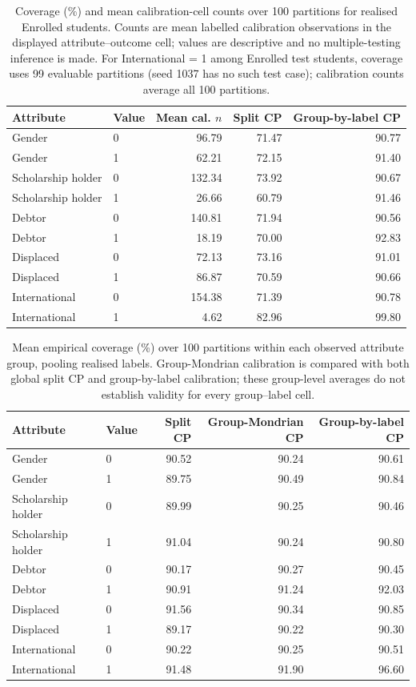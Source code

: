 \begin{table}[htbp]
\centering\small
\caption{Coverage (\%) and mean calibration-cell counts over 100 partitions
for realised \textsf{Enrolled} students. Counts are mean labelled
calibration observations in the displayed attribute--outcome cell;
values are descriptive and no multiple-testing inference is made. For International = 1 among Enrolled test students, coverage uses 99 evaluable partitions (seed 1037 has no such test case); calibration counts average all 100 partitions.}
\label{tab:groupaudit}
\begin{tabular}{llrrr}
\toprule Attribute & Value & Mean cal. $n$ & Split CP & Group-by-label CP\\
\midrule
Gender & 0 & 96.79 & 71.47 & 90.77\\
Gender & 1 & 62.21 & 72.15 & 91.40\\
Scholarship holder & 0 & 132.34 & 73.92 & 90.67\\
Scholarship holder & 1 & 26.66 & 60.79 & 91.46\\
Debtor & 0 & 140.81 & 71.94 & 90.56\\
Debtor & 1 & 18.19 & 70.00 & 92.83\\
Displaced & 0 & 72.13 & 73.16 & 91.01\\
Displaced & 1 & 86.87 & 70.59 & 90.66\\
International & 0 & 154.38 & 71.39 & 90.78\\
International & 1 & 4.62 & 82.96 & 99.80\\
\bottomrule
\end{tabular}
\end{table}

\begin{table}[htbp]
\centering\small
\caption{Mean empirical coverage (\%) over 100 partitions within each observed attribute group, pooling realised labels. Group-Mondrian calibration is compared with both global split CP and group-by-label calibration; these group-level averages do not establish validity for every group--label cell.}
\label{tab:groupoverall}
\begin{tabular}{llrrr}
\toprule Attribute & Value & Split CP & Group-Mondrian CP & Group-by-label CP\\
\midrule
Gender & 0 & 90.52 & 90.24 & 90.61\\
Gender & 1 & 89.75 & 90.49 & 90.84\\
Scholarship holder & 0 & 89.99 & 90.25 & 90.46\\
Scholarship holder & 1 & 91.04 & 90.24 & 90.80\\
Debtor & 0 & 90.17 & 90.27 & 90.45\\
Debtor & 1 & 90.91 & 91.24 & 92.03\\
Displaced & 0 & 91.56 & 90.34 & 90.85\\
Displaced & 1 & 89.17 & 90.22 & 90.30\\
International & 0 & 90.22 & 90.25 & 90.51\\
International & 1 & 91.48 & 91.90 & 96.60\\
\bottomrule
\end{tabular}
\end{table}

